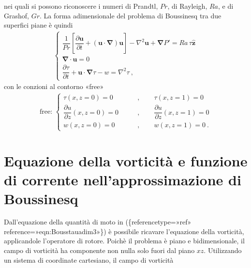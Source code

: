 \documentclass[letterpaper,10pt,italian]{jupyterBook}
\begin{document}
\sphinxAtStartPar
nei quali si possono riconoscere i numeri di Prandtl,
\(Pr\), di Rayleigh, \(Ra\), e di Grashof, \(Gr\). La forma adimensionale del
problema di Boussinesq tra due superfici piane è quindi
\begin{equation*}
\begin{split}\label{eqn:Bouss-tau-adim-3}
    \begin{cases}
      \dfrac{1}{Pr} \left[ \dfrac{\partial \mathbf{u}}{\partial t} +
      \left( \mathbf{u} \cdot \mathbf{\nabla} \right) \mathbf{u} \right] -
      \nabla^2 \mathbf{u} + \mathbf{\nabla} P' = Ra \, \tau \mathbf{\hat{z}} \\
      \mathbf{\nabla} \cdot \mathbf{u} = 0 \\
      \dfrac{\partial \tau}{\partial t} + \mathbf{u} \cdot 
      \mathbf{\nabla} \tau -  w = \nabla^{2} \tau \ ,
\end{cases}\end{split}
\end{equation*}
\sphinxAtStartPar
con le conzioni al contorno «free»
\begin{equation*}
\begin{split}\label{eqn:Bouss-adim-3-bc}
    \text{free: }
    \left\{
    \begin{aligned}
      \tau(x,z=0) = 0 \qquad  & , \qquad 
      \tau(x,z=1) = 0 \\
      \dfrac{\partial u}{\partial z}(x,z=0) = 0 \qquad & , \qquad 
      \dfrac{\partial u}{\partial z}(x,z=1) = 0 \\
      w(x,z=0) = 0 \qquad & , \qquad w(x,z=1) = 0 \ .
\end{aligned} \right.\end{split}
\end{equation*}

\section{Equazione della vorticità e funzione di corrente nell’approssimazione di Boussinesq}
\label{\detokenize{polimi/fluidmechanics-ita/template/capitoli/07_similitudine/07teoria:equazione-della-vorticita-e-funzione-di-corrente-nell-approssimazione-di-boussinesq}}
\sphinxAtStartPar
Dall’equazione della quantità di moto in
(\{reference\sphinxhyphen{}type=»ref»
reference=»eqn:Bouss\sphinxhyphen{}tau\sphinxhyphen{}adim\sphinxhyphen{}3»\}) è possibile ricavare l’equazione
della vorticità, applicandole l’operatore di rotore. Poichè il problema
è piano e bidimensionale, il campo di vorticità ha componente non nulla
solo fuori dal piano \(xz\). Utilizzando un sistema di coordinate
cartesiano, il campo di vorticità
\end{document}
